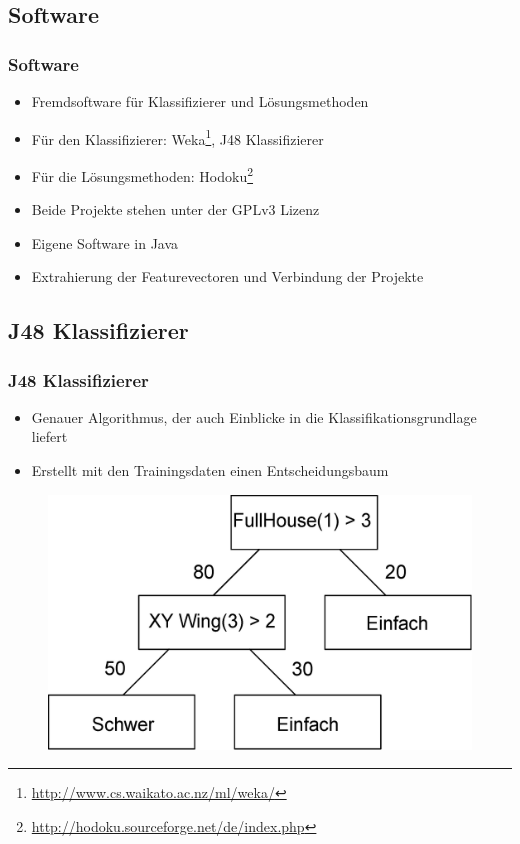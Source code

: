 \documentclass[accentcolor=tud6b,colorbacktitle,inverttitle,landscape,german,presentation,t]{tudbeamer}
\begin{document}
	\subsection{Software}
		\begin{frame}
		\frametitle{Software}
		\begin{itemize}
		\item Fremdsoftware für Klassifizierer und Lösungsmethoden
		\item Für den Klassifizierer: Weka\footnote{\url{http://www.cs.waikato.ac.nz/ml/weka/}}, J48 Klassifizierer
		\item Für die Lösungsmethoden: Hodoku\footnote{\url{http://hodoku.sourceforge.net/de/index.php}}
		\item Beide Projekte stehen unter der GPLv3 Lizenz
		\item Eigene Software in Java
		\item Extrahierung der Featurevectoren und Verbindung der Projekte
		\end{itemize}
		\end{frame}

	\subsection{J48 Klassifizierer}
		\begin{frame}
		\frametitle{J48 Klassifizierer}
		\begin{itemize}
		\item Genauer Algorithmus, der auch Einblicke in die Klassifikationsgrundlage liefert
		\item Erstellt mit den Trainingsdaten einen Entscheidungsbaum
		\end{itemize}
		\begin{figure}[Hh]
    		\includegraphics[width=\textwidth - 150pt,height=\textheight-10pt,keepaspectratio]{./img/entscheidungsbaum.eps}
		\end{figure}
		\end{frame}
\end{document}
